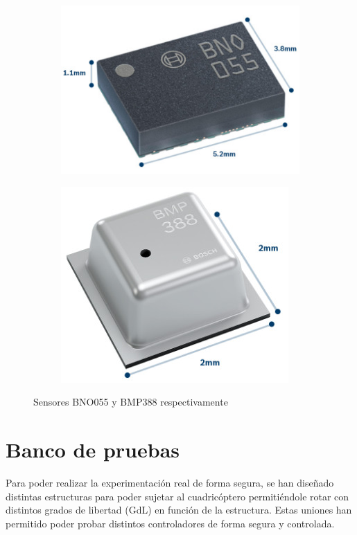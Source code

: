 	
\begin{figure}[htb!]
	\centering
	\begin{subfigure}{0.4\textwidth}
		\centering
		\includegraphics[height=0.5\textwidth]{hardware/bno055.jpeg}
		\label{BNO055}
	\end{subfigure}
	\begin{subfigure}{0.4\textwidth}
		\centering
		\includegraphics[height=0.5\textwidth]{hardware/bmp388.jpeg}
		\label{BMP388}
	\end{subfigure}
	\caption{Sensores BNO055 y BMP388 respectivamente}
\end{figure}


 

\section{Banco de pruebas}
Para poder realizar la experimentación real de forma segura, se han diseñado distintas estructuras para poder sujetar al cuadricóptero permitiéndole rotar con distintos grados de libertad (GdL) en función de la estructura. Estas uniones han permitido poder probar distintos controladores de forma segura y controlada.


